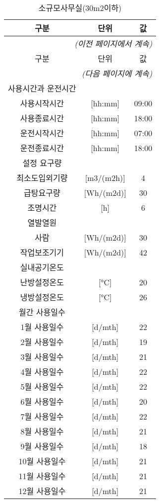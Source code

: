 \renewcommand{\arraystretch}{0.9}
\begin{longtable}{ccc}
  \caption{소규모사무실(30m2이하)} \\
  \toprule
  \small
  구분 & 단위 & 값 \\ \midrule
  \endfirsthead
  \multicolumn{3}{r}{\textit{(이전 페이지에서 계속)}} \\ \toprule
  구분 & 단위 & 값 \\ \midrule
  \endhead
  \midrule \multicolumn{3}{r}{\textit{(다음 페이지에 계속)}} \\ \bottomrule
  \endfoot
  \bottomrule
  \endlastfoot
  사용시간과 운전시간 & & \\
  \midrule
  사용시작시간 & [hh:mm] & 09:00 \\
  사용종료시간 & [hh:mm] & 18:00 \\
  운전시작시간 & [hh:mm] & 07:00 \\
  운전종료시간 & [hh:mm] & 18:00 \\
  \midrule
  설정 요구량 & & \\
  \midrule
  최소도입외기량 & [m3/(m2h)] & 4 \\
  급탕요구량 & [Wh/(m2d)] & 30 \\
  조명시간 & [h] & 6 \\
  \midrule
  열발열원 & & \\
  \midrule
  사람 & [Wh/(m2d)] & 30 \\
  작업보조기기 & [Wh/(m2d)] & 42 \\
  \midrule
  실내공기온도 & & \\
  \midrule
  난방설정온도 & [°C] & 20 \\
  냉방설정온도 & [°C] & 26 \\
  \midrule
  월간 사용일수 & & \\
  \midrule
  1월 사용일수 & [d/mth] & 22 \\
  2월 사용일수 & [d/mth] & 19 \\
  3월 사용일수 & [d/mth] & 21 \\
  4월 사용일수 & [d/mth] & 22 \\  
  5월 사용일수 & [d/mth] & 22 \\
  6월 사용일수 & [d/mth] & 20 \\
  7월 사용일수 & [d/mth] & 22 \\
  8월 사용일수 & [d/mth] & 21 \\
  9월 사용일수 & [d/mth] & 18 \\
  10월 사용일수 & [d/mth] & 21 \\
  11월 사용일수 & [d/mth] & 21 \\
  12월 사용일수 & [d/mth] & 21 \\
\end{longtable}




